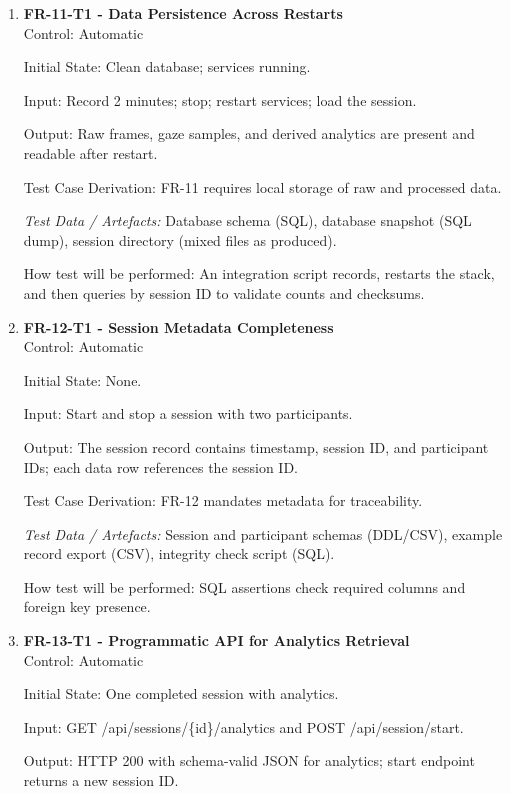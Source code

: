 \documentclass[12pt, titlepage]{article}
\begin{document}
\begin{enumerate}

\item \textbf{FR-11-T1 - Data Persistence Across Restarts} \\

Control: Automatic

Initial State: Clean database; services running.

Input: Record 2 minutes; stop; restart services; load the session.

Output: Raw frames, gaze samples, and derived analytics are present and readable after restart.

Test Case Derivation: FR-11 requires local storage of raw and processed data.

\textit{Test Data / Artefacts:} Database schema (SQL), database snapshot (SQL dump), session directory (mixed files as produced).

How test will be performed: An integration script records, restarts the stack, and then queries by session ID to validate counts and checksums.

\item \textbf{FR-12-T1 - Session Metadata Completeness} \\

Control: Automatic

Initial State: None.

Input: Start and stop a session with two participants.

Output: The session record contains timestamp, session ID, and participant IDs; each data row references the session ID.

Test Case Derivation: FR-12 mandates metadata for traceability.

\textit{Test Data / Artefacts:} Session and participant schemas (DDL/CSV), example record export (CSV), integrity check script (SQL).

How test will be performed: SQL assertions check required columns and foreign key presence.

\item \textbf{FR-13-T1 - Programmatic API for Analytics Retrieval} \\

Control: Automatic

Initial State: One completed session with analytics.

Input: GET /api/sessions/\{id\}/analytics and POST /api/session/start.

Output: HTTP 200 with schema-valid JSON for analytics; start endpoint returns a new session ID.


\end{enumerate}
\end{document}
